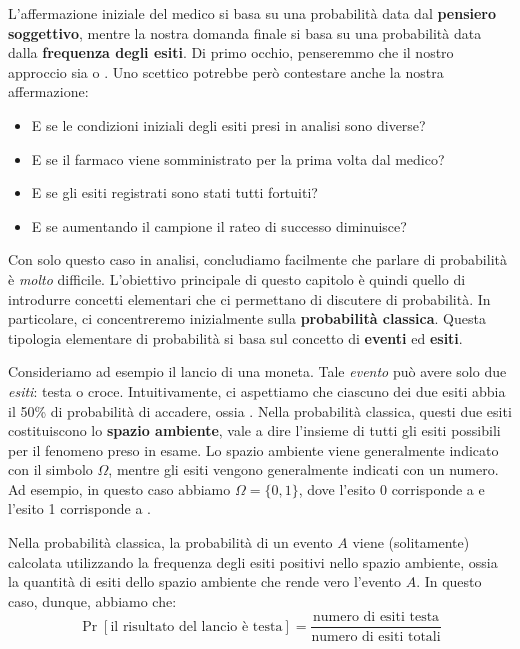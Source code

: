 \documentclass[a4paper, 12pt]{report}
\begin{document}
    L'affermazione iniziale del medico si basa su una probabilità data dal \textbf{pensiero soggettivo}, mentre la nostra domanda finale si basa su una probabilità data dalla \textbf{frequenza degli esiti}. Di primo occhio, penseremmo che il nostro approccio sia  o . Uno scettico potrebbe però contestare anche la nostra affermazione:
    \begin{itemize}
        \item E se le condizioni iniziali degli esiti presi in analisi sono diverse?
        \item E se il farmaco viene somministrato per la prima volta dal medico?
        \item E se gli esiti registrati sono stati tutti fortuiti?
        \item E se aumentando il campione il rateo di successo diminuisce?
    \end{itemize}

    Con solo questo caso in analisi, concludiamo facilmente che parlare di probabilità è \textit{molto} difficile. L'obiettivo principale di questo capitolo è quindi quello di introdurre concetti elementari che ci permettano di discutere di probabilità. In particolare, ci concentreremo inizialmente sulla \textbf{probabilità classica}. Questa tipologia elementare di probabilità si basa sul concetto di \textbf{eventi} ed \textbf{esiti}.
    
    Consideriamo ad esempio il lancio di una moneta. Tale \textit{evento} può avere solo due \textit{esiti}: testa o croce. Intuitivamente, ci aspettiamo che ciascuno dei due esiti abbia il 50\% di probabilità di accadere, ossia . Nella probabilità classica, questi due esiti costituiscono lo \textbf{spazio ambiente}, vale a dire l'insieme di tutti gli esiti possibili per il fenomeno preso in esame. Lo spazio ambiente viene generalmente indicato con il simbolo $\Omega$, mentre gli esiti vengono generalmente indicati con un numero. Ad esempio, in questo caso abbiamo $\Omega = \{0,1\}$, dove l'esito 0 corrisponde a  e l'esito 1 corrisponde a .

    Nella probabilità classica, la probabilità di un evento $A$ viene (solitamente) calcolata utilizzando la frequenza degli esiti positivi nello spazio ambiente, ossia la quantità di esiti dello spazio ambiente che rende vero l'evento $A$. In questo caso, dunque, abbiamo che:
    \[\Pr[\text{il risultato del lancio è testa}] = \frac{\text{numero di esiti testa}}{\text{numero di esiti totali}}\]
\end{document}
